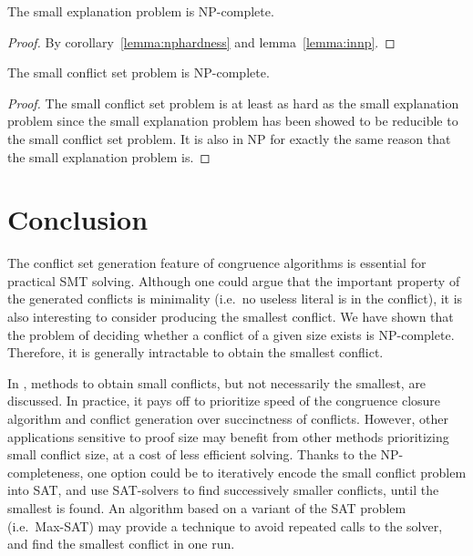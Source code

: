 \documentclass[smallextended]{svjour3}
\begin{document}
\begin{theorem}[NP-completeness]
The small explanation problem is NP-complete.
\end{theorem}
\begin{proof}
By corollary~\ref{lemma:nphardness} and lemma~\ref{lemma:innp}.
\end{proof}

\begin{theorem}[NP-completeness]
The small conflict set problem is NP-complete.
\end{theorem}
\begin{proof}
The small conflict set problem is at least as hard as the small explanation problem since the small explanation problem has been showed to be reducible to the small conflict set problem.  It is also in NP for exactly the same reason that the small explanation problem is.
\end{proof}


\section*{Conclusion}

The conflict set generation feature of congruence algorithms is essential for
practical SMT solving.  Although one could argue that the important property of the generated conflicts is minimality (i.e.\ no useless literal is in the conflict), it is also interesting to consider producing the smallest conflict.  We have shown that the problem of deciding whether a conflict of a given size exists is NP-complete. Therefore, it is generally intractable to obtain the smallest conflict. 

In \cite{Fontaine1,Nieuwenhuis3,Nieuwenhuis9}, methods to obtain small
conflicts, but not necessarily the smallest, are discussed.  In practice, it
pays off to prioritize speed of the congruence closure algorithm and conflict
generation over succinctness of conflicts.  However, other applications
sensitive to proof size may benefit from other methods prioritizing small
conflict size, at a cost of less efficient solving. Thanks to the
NP-completeness, one option could be to iteratively encode the small conflict
problem into SAT, and use SAT-solvers to find successively smaller conflicts,
until the smallest is found.  An algorithm based on a variant of the SAT problem
(i.e.\ Max-SAT) may provide a technique to avoid repeated calls to the solver,
and find the smallest conflict in one run.
\end{document}
